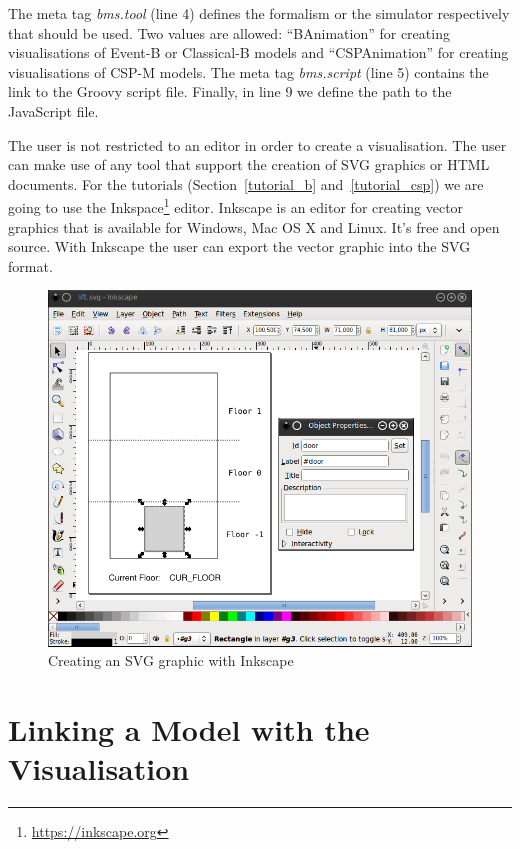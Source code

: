 The meta tag \textit{bms.tool} (line 4) defines the formalism or the simulator respectively that should be used. 
Two values are allowed: ``BAnimation'' for creating visualisations of Event-B or Classical-B models and ``CSPAnimation'' for creating visualisations of CSP-M models.
The meta tag \textit{bms.script} (line 5) contains the link to the Groovy script file.
Finally, in line 9 we define the path to the JavaScript file.

The user is not restricted to an editor in order to create a visualisation.
The user can make use of any tool that support the creation of SVG graphics or HTML documents.
For the tutorials (Section~\ref{tutorial_b} and~\ref{tutorial_csp}) we are going to use the Inkspace\footnote{\url{https://inkscape.org}} editor. Inkscape is an editor for creating vector graphics that is available for Windows, Mac OS X and Linux.
It's free and open source.
With Inkscape the user can export the vector graphic into the SVG format.

\begin{figure}[!ht]
\begin{center}
	\includegraphics[width=12cm]{img/tutorial/tut_02.png}
	\caption{Creating an SVG graphic with Inkscape}
	\label{fig_tut_02_inkscape}
\end{center}
\end{figure} 


\section{Linking a Model with the Visualisation}

